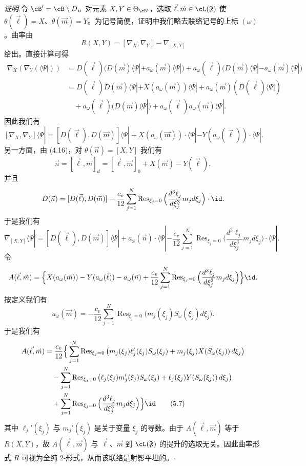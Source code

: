 \noindent\textit{证明.}\quad 令 $\cB'=\cB\setminus D$。对元素 $X,Y\in\Theta_{\cB'}$，选取 $\vec\ell,\vec m\in\cL(\mathfrak F)$ 使 $\theta(\vec\ell)=X$、$\theta(\vec m)=Y$。为记号简便，证明中我们略去联络记号的上标 $(\omega)$。曲率由
\[
 R(X,Y)=[\nabla_X,\nabla_Y]-\nabla_{[X,Y]}
\]
给出。直接计算可得
\begin{align*}
 \nabla_X(\nabla_Y(\langle\Psi|))
 &=D(\vec\ell)\big(D(\vec m)\langle\Psi|+a_\omega(\vec m)\langle\Psi|\big)
   +a_\omega(\vec\ell)\big(D(\vec m)\langle\Psi|-a_\omega(\vec m)\langle\Psi|\big)\\
 &=D(\vec\ell)D(\vec m)\langle\Psi|+X(a_\omega(\vec m))\langle\Psi|
   +a_\omega(\vec m)(D(\vec\ell)\langle\Psi|)\\
 &\quad+a_\omega(\vec\ell)(D(\vec m)\langle\Psi|)+a_\omega(\vec\ell)a_\omega(\vec m)\langle\Psi|.
\end{align*}
因此我们有
\[
 [\nabla_X,\nabla_Y]\langle\Psi|=[D(\vec\ell),D(\vec m)]\langle\Psi|
 +X(a_\omega(\vec m))\cdot\langle\Psi|-Y(a_\omega(\vec\ell))\cdot\langle\Psi|.
\]
另一方面，由 (4.16)，对 $\theta(\vec n)=[X,Y]$ 我们有
\[
 \vec n=[\vec\ell,\vec m]_d=[\vec\ell,\vec m]_0+X(\vec m)-Y(\vec\ell),
\]
并且
\[
 D(\vec n)=[D(\vec\ell),D(\vec m)]
 -\frac{c_v}{12}\sum_{j=1}^{N}\operatorname{Res}_{\xi_j=0}
 \Big(\frac{d^3\ell_j}{d\xi_j^3}m_jd\xi_j\Big)\cdot\id.
\]
于是我们有
\[
 \nabla_{[X,Y]}\langle\Psi|=[D(\vec\ell),D(\vec m)]\langle\Psi|
 +a_\omega(\vec n)\cdot\langle\Psi|
 -\frac{c_v}{12}\sum_{j=1}^{N}\operatorname{Res}_{\xi_j=0}
 \Big(\frac{d^3\ell_j}{d\xi_j^3}m_jd\xi_j\Big)\cdot\langle\Psi|.
\]
令
\[
 A(\vec\ell,\vec m)=\Big\{X(a_\omega(\vec m))-Y(a_\omega(\vec\ell))-a_\omega(\vec n)
 +\frac{c_v}{12}\sum_{j=1}^{N}\operatorname{Res}_{\xi_j=0}
 \Big(\frac{d^3\ell_j}{d\xi_j^3}m_jd\xi_j\Big)\Big\}\id.
\]
按定义我们有
\[
 a_\omega(\vec m)=-\frac{c_v}{12}\sum_{j=1}^{N}\operatorname{Res}_{\xi_j=0}
 \big(m_j(\xi_j)S_\omega(\xi_j)d\xi_j\big).
\]
于是我们有
\begin{align}
 A(\vec\ell,\vec m)&=\frac{c_v}{12}\Big\{\sum_{j=1}^{N}\operatorname{Res}_{\xi_j=0}
 \big(m_j(\xi_j)\ell_j'(\xi_j)S_\omega(\xi_j)+m_j(\xi_j)X(S_\omega(\xi_j))\,d\xi_j\big)
 \nonumber\\
 &\quad-\sum_{j=1}^{N}\operatorname{Res}_{\xi_j=0}
 \big(\ell_j(\xi_j)m_j'(\xi_j)S_\omega(\xi_j)+\ell_j(\xi_j)Y(S_\omega(\xi_j))\,d\xi_j\big)
 \nonumber\\
 &\quad+\sum_{j=1}^{N}\operatorname{Res}_{\xi_j=0}
 \Big(\frac{d^3\ell_j}{d\xi_j^3}m_jd\xi_j\Big)\Big\}\id \tag{5.7}
\end{align}
其中 $\ell_j'(\xi_j)$ 与 $m_j'(\xi_j)$ 是关于变量 $\xi_j$ 的导数。由于 $A(\vec\ell,\vec m)$ 等于 $R(X,Y)$，故 $A(\vec\ell,\vec m)$ 与 $\vec\ell$、$\vec m$ 到 $\cL(\mathfrak F)$ 的提升的选取无关。因此曲率形式 $R$ 可视为全纯 2-形式，从而该联络是射影平坦的。\hfill$\square$

